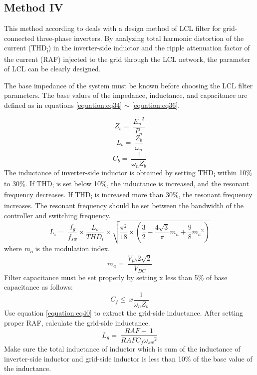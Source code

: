 \documentclass[12pt,a4paper]{book}
\begin{document}
\subsection{Method IV}
This method according to \cite{lcl2010} deals with a design method of LCL filter for grid-connected three-phase inverters. By analyzing total harmonic distortion of the current (THD\textsubscript{i}) in the inverter-side inductor and the ripple attenuation factor of the current (RAF) injected to the grid through the LCL network, the parameter of LCL can be clearly designed.

The base impedance of the system must be known before choosing the LCL filter parameters. The base values of the impedance, inductance, and capacitance are defined as in equations \ref{equation:eq34} \(\sim\) \ref{equation:eq36}.

\begin{equation}
  Z_{b} = \ \frac{{E_{n}}^{2}}{P_{n}}
  \label{equation:eq34}
\end{equation}
\begin{equation}
  L_{b} = \ \frac{Z_{b}}{\omega_{n}}
  \label{equation:eq35}
\end{equation}
\begin{equation}
  C_{b} = \ \frac{1}{\omega_{n}Z_{b}}
  \label{equation:eq36}
\end{equation}
The inductance of inverter-side inductor is obtained by setting THD\textsubscript{i} within 10\% to 30\%. If THD\textsubscript{i} is set below 10\%, the inductance is increased, and the resonant frequency decreases. If THD\textsubscript{i} is increased more than 30\%, the resonant frequency increases. The resonant frequency should be set between the bandwidth of the controller and switching frequency.
\begin{equation}
  L_{i} = \ \frac{f_{g}}{f_{sw}} \times \frac{L_{b}}{{THD}_{i}} \times \sqrt{\frac{\pi^{2}}{18} \times \left( \frac{3}{2} - \frac{4\sqrt{3}}{\pi}m_{a} + \frac{9}{8}{m_{a}}^{2} \right)}
  \label{equation:eq37}
\end{equation}
where \emph{m\textsubscript{a}} is the modulation index.
\begin{equation}
  m_{a} = \ \frac{V_{ph}2\sqrt{2}}{V_{DC}}
  \label{equation:eq38}
\end{equation}
Filter capacitance must be set properly by setting x less than 5\% of base capacitance as follows:
\begin{equation}
  C_{f} \leq \ x\frac{1}{\omega_{n}Z_{b}}
  \label{equation:eq39}
\end{equation}
Use equation \ref{equation:eq40} to extract the grid-side inductance. After setting proper RAF, calculate the grid-side inductance.
\begin{equation}
  L_{g} = \ \frac{RAF + \ 1}{{RAFC}_{f}{\omega_{sw}}^{2}}
  \label{equation:eq40}
\end{equation}
Make sure the total inductance of inductor which is sum of the inductance of inverter-side inductor and grid-side inductor is less than 10\% of the base value of the inductance.
\end{document}
